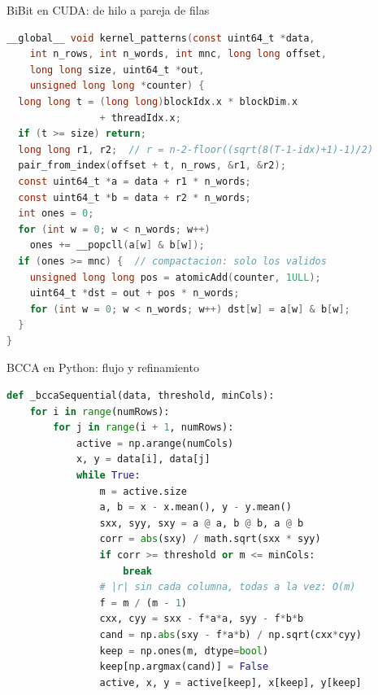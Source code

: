 \documentclass[10pt,aspectratio=169]{beamer}
\makeatletter
\newcommand{\hlcheck}[1]{\color{backcolor}\@for\hl@n:=#1\do{\ifnum\value{lstnumber}=\hl@n\relax\color{hlcolor}\fi}}
\makeatother
\begin{document}
\begin{frame}[fragile]{BiBit en CUDA: de hilo a pareja de filas}
\begin{lstlisting}[language=C,basicstyle=\ttfamily\scriptsize,linebackgroundcolor={\hlcheck{5,6,8,9,14,16}}]
__global__ void kernel_patterns(const uint64_t *data,
    int n_rows, int n_words, int mnc, long long offset,
    long long size, uint64_t *out,
    unsigned long long *counter) {
  long long t = (long long)blockIdx.x * blockDim.x
                + threadIdx.x;
  if (t >= size) return;
  long long r1, r2;  // r = n-2-floor((sqrt(8(T-1-idx)+1)-1)/2)
  pair_from_index(offset + t, n_rows, &r1, &r2);
  const uint64_t *a = data + r1 * n_words;
  const uint64_t *b = data + r2 * n_words;
  int ones = 0;
  for (int w = 0; w < n_words; w++)
    ones += __popcll(a[w] & b[w]);
  if (ones >= mnc) {  // compactacion: solo los validos
    unsigned long long pos = atomicAdd(counter, 1ULL);
    uint64_t *dst = out + pos * n_words;
    for (int w = 0; w < n_words; w++) dst[w] = a[w] & b[w];
  }
}
\end{lstlisting}
\end{frame}

\begin{frame}[fragile]{BCCA en Python: flujo y refinamiento}
\begin{lstlisting}[language=Python,basicstyle=\ttfamily\scriptsize,linebackgroundcolor={\hlcheck{2,3,6,13,14,15,16}}]
def _bccaSequential(data, threshold, minCols):
    for i in range(numRows):
        for j in range(i + 1, numRows):
            active = np.arange(numCols)
            x, y = data[i], data[j]
            while True:
                m = active.size
                a, b = x - x.mean(), y - y.mean()
                sxx, syy, sxy = a @ a, b @ b, a @ b
                corr = abs(sxy) / math.sqrt(sxx * syy)
                if corr >= threshold or m <= minCols:
                    break
                # |r| sin cada columna, todas a la vez: O(m)
                f = m / (m - 1)
                cxx, cyy = sxx - f*a*a, syy - f*b*b
                cand = np.abs(sxy - f*a*b) / np.sqrt(cxx*cyy)
                keep = np.ones(m, dtype=bool)
                keep[np.argmax(cand)] = False
                active, x, y = active[keep], x[keep], y[keep]
\end{lstlisting}
\end{frame}
\end{document}
